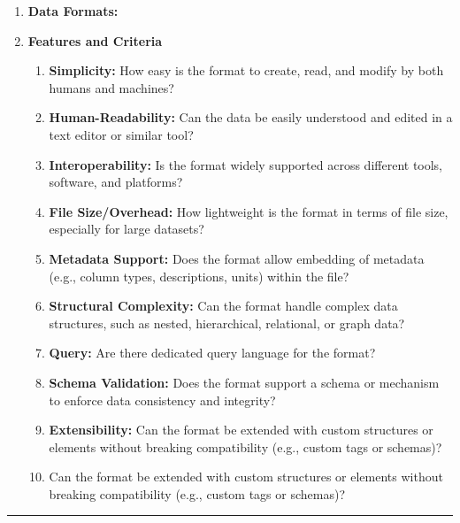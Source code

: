 \documentclass[a4paper,10pt]{article}
\begin{document}
\begin{enumerate}[label=\textbf{List \arabic*.}]
    \item \textbf{Data Formats:}

    \noindent{}
    \item \textbf{Features and Criteria}
    \begin{enumerate}[label=\text{\arabic*.}]
        \item \textbf{Simplicity:} How easy is the format to create, read, and modify by both humans and machines?
        \item \textbf{Human-Readability:} Can the data be easily understood and edited in a text editor or similar tool?
        \item \textbf{Interoperability:} Is the format widely supported across different tools, software, and platforms?
        \item \textbf{File Size/Overhead:} How lightweight is the format in terms of file size, especially for large datasets?
        \item \textbf{Metadata Support:} Does the format allow embedding of metadata (e.g., column types, descriptions, units) within the file?
        \item \textbf{Structural Complexity:} Can the format handle complex data structures, such as nested, hierarchical, relational, or graph data?
        \item \textbf{Query:} Are there dedicated query language for the format?
        \item \textbf{Schema Validation:} Does the format support a schema or mechanism to enforce data consistency and integrity?
        \item \textbf{Extensibility:} Can the format be extended with custom structures or elements without breaking compatibility (e.g., custom tags or schemas)?
        \item Can the format be extended with custom structures or elements without breaking compatibility (e.g., custom tags or schemas)?
    \end{enumerate}
\end{enumerate}

\noindent\rule{\textwidth}{0.4mm} 
\end{document}
